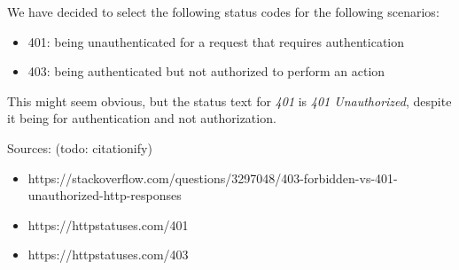\documentclass[bsc,frontabs,twoside,singlespacing,parskip,deptreport]{infthesis}     %
\begin{document}
We have decided to select the following status codes for the following scenarios:

\begin{itemize}
  \item 401: being unauthenticated for a request that requires authentication
  \item 403: being authenticated but not authorized to perform an action
\end{itemize}

This might seem obvious, but the status text for \emph{401} is \emph{401 Unauthorized},
despite it being for authentication and not authorization.

Sources: (todo: citationify)
\begin{itemize}
  \item https://stackoverflow.com/questions/3297048/403-forbidden-vs-401-unauthorized-http-responses
  \item https://httpstatuses.com/401
  \item https://httpstatuses.com/403
\end{itemize}





\end{document}
